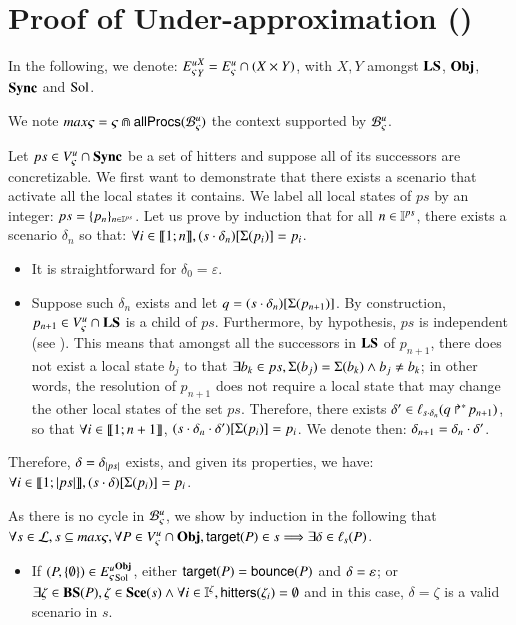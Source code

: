 \section{Proof of Under-approximation ()}
\label{suppl:demoapproxinf}


In the following, we denote:
${E_\varsigma^u}^{X}_{Y} = {E_\varsigma^u} \cap (X \times Y)$, with $X, Y$
amongst $\mathbf{LS}$, $\mathbf{Obj}$, $\mathbf{Sync}$ and $\mathrm{Sol}$.

\begin{proofapproxinf}
We note $max\varsigma = \varsigma \Cap \mathsf{allProcs}({\mathcal{B}_{\varsigma}^{u}})$ the context supported by ${\mathcal{B}_{\varsigma}^{u}}$.

Let $ps \in {V_\varsigma^u} \cap \mathbf{Sync}$ be a set of hitters
and suppose all of its successors are concretizable.
We first want to demonstrate that
there exists a scenario that activate all the local states it contains.
We label all local states of $ps$ by an integer: $ps = \{ p_n \}_{n \in \mathbb{I}^{ps}}$.
Let us prove by induction that for all $n \in \mathbb{I}^{ps}$, there exists a scenario $\delta_n$ so that:
$\forall i \in \llbracket 1; n \rrbracket, {(s \cdot \delta_n)[\Sigma(p_i)]} = p_i$.
\begin{itemize}
  \item It is straightforward for $\delta_0 = \varepsilon$.
  \item Suppose such $\delta_n$ exists and let $q = {(s \cdot \delta_n)[\Sigma(p_{n+1})]}$.
    By construction, $p_{n+1} \in {V_\varsigma^u} \cap \mathbf{LS}$ is a child of $ps$.
    Furthermore, by hypothesis, $ps$ is independent (see ).
    This means that amongst all the successors in $\mathbf{LS}$ of $p_{n+1}$,
    there does not exist a local state $b_j$ to that
    $\exists b_k \in ps, \Sigma(b_j) = \Sigma(b_k) \wedge b_j \neq b_k$;
    in other words, the resolution of $p_{n+1}$ does not require a local state
    that may change the other local states of the set $ps$.
    Therefore, there exists $\delta' \in \ell_{s \cdot \delta_n}(\mbox{$q\Rsh^*\!p_{n+1}$})$,
    so that $\forall i \in \llbracket 1; n+1 \rrbracket$, ${(s \cdot \delta_n \cdot \delta')[\Sigma(p_{i})]} = p_{i}$.
    We denote then: $\delta_{n+1} = \delta_n \cdot \delta'$.
\end{itemize}
Therefore, $\delta = \delta_{|ps|}$ exists, and given its properties, we have:
$\forall i \in \llbracket 1; |ps| \rrbracket, {(s \cdot \delta)[\Sigma(p_{i})]} = p_{i}$.

As there is no cycle in ${\mathcal{B}_{\varsigma}^{u}}$, we show by induction in the following that
$\forall s\in \mathcal{L}, s\subseteq max\varsigma, \forall P \in {V_\varsigma^u} \cap \mathbf{Obj},
\mathsf{target}(P) \in s \Longrightarrow \exists \delta \in \ell_s(P)$.
\begin{itemize}
  \item If $(P, \{ \emptyset \}) \in {E_\varsigma^u}^{\mathbf{Obj}}_{\mathrm{Sol}}$,
    either $\mathsf{target}(P) = \mathsf{bounce}(P)$ and $\delta = \varepsilon$;
    or $\exists \zeta \in \mathbf{BS}(P), \zeta \in \mathbf{Sce}(s) \wedge
      \forall i \in \mathbb{I}^{\zeta}, \mathsf{hitters}(\zeta_i) = \emptyset$
    and in this case, $\delta = \zeta$ is a valid scenario in $s$.


\end{itemize}
\end{proofapproxinf}
